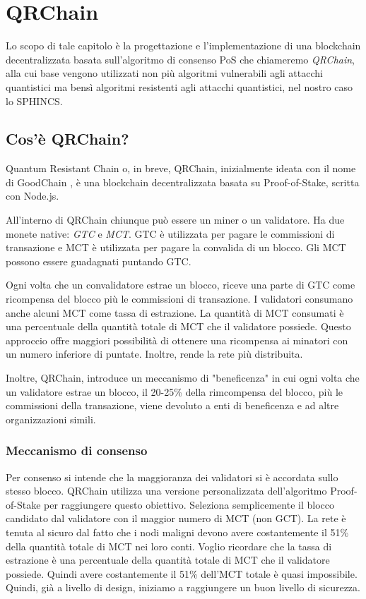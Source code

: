\chapter{QRChain}
Lo scopo di tale capitolo è la progettazione e l'implementazione di una blockchain decentralizzata basata sull'algoritmo di consenso PoS che chiameremo \textit{QRChain}, alla cui base vengono utilizzati non più algoritmi vulnerabili agli attacchi quantistici ma bensì algoritmi resistenti agli attacchi quantistici, nel nostro caso lo SPHINCS.

\section{Cos'è QRChain?}
Quantum Resistant Chain o, in breve, QRChain, inizialmente ideata con il nome di GoodChain \cite{Ghorbanzadeh_GoodChain_2022}, è una blockchain decentralizzata basata su Proof-of-Stake, scritta con Node.js.

All'interno di QRChain chiunque può essere un miner o un validatore. Ha due monete native: \textit{GTC} e \textit{MCT}. GTC è utilizzata per pagare le commissioni di transazione e MCT è utilizzata per pagare la convalida di un blocco. Gli MCT possono essere guadagnati puntando GTC.

Ogni volta che un convalidatore estrae un blocco, riceve una parte di GTC come ricompensa del blocco più le commissioni di transazione.
I validatori consumano anche alcuni MCT come tassa di estrazione. La quantità di MCT consumati è una percentuale della quantità totale di MCT che il validatore possiede.
Questo approccio offre maggiori possibilità di ottenere una ricompensa ai minatori con un numero inferiore di puntate. Inoltre, rende la rete più distribuita.

Inoltre, QRChain, introduce un meccanismo di "beneficenza" in cui ogni volta che un validatore estrae un blocco, il 20-25\% della rimcompensa del blocco, più le commissioni della transazione, viene devoluto a enti di beneficenza e ad altre organizzazioni simili.

\subsection{Meccanismo di consenso}
Per consenso si intende che la maggioranza dei validatori si è accordata sullo stesso blocco.
QRChain utilizza una versione personalizzata dell'algoritmo Proof-of-Stake per raggiungere questo obiettivo. Seleziona semplicemente il blocco candidato dal validatore con il maggior numero di MCT (non GCT).
La rete è tenuta al sicuro dal fatto che i nodi maligni devono avere costantemente il 51\% della quantità totale di MCT nei loro conti. Voglio ricordare che la tassa di estrazione è una percentuale della quantità totale di MCT che il validatore possiede. Quindi avere costantemente il 51\% dell'MCT totale è quasi impossibile. Quindi, già a livello di design, iniziamo a raggiungere un buon livello di sicurezza.

